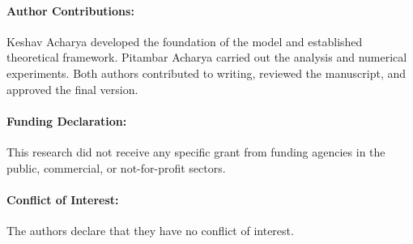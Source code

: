 \documentclass[reqno]{amsart}
\numberwithin{equation}{section}
\begin{document}
\paragraph{\bf Author Contributions: }
Keshav Acharya developed the foundation of the model and established theoretical framework.
Pitambar Acharya carried out the analysis and numerical experiments.
Both authors contributed to writing, reviewed the manuscript,
and approved the final version.\\


\paragraph{\bf Funding Declaration:}
This research did not receive any specific grant from funding agencies in the public, commercial, or not-for-profit sectors.\\

\paragraph{\bf Conflict of Interest: }
The authors declare that they have no conflict of interest.




\end{document}
